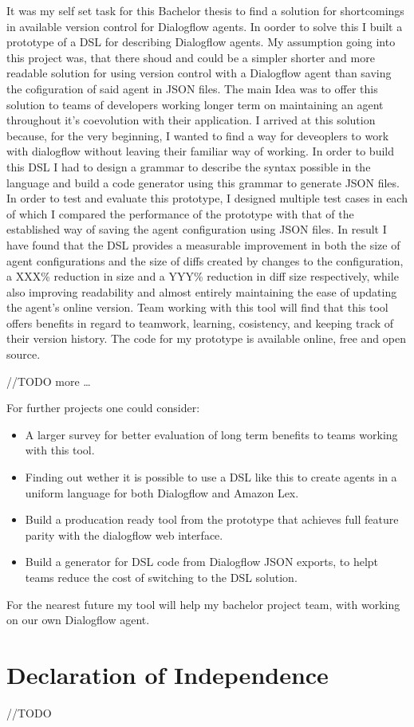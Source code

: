 It was my self set task for this Bachelor thesis to find a solution for shortcomings in available version control for Dialogflow agents. In oorder to solve this I built a prototype of a DSL for describing Dialogflow agents.
My assumption going into this project was, that there shoud and could be a simpler shorter and more readable solution for using version control with a Dialogflow agent than saving the cofiguration of said agent in JSON files.
The main Idea was to offer this solution to teams of developers working longer term on maintaining an agent throughout it's coevolution with their application.
I arrived at this solution because, for the very beginning, I wanted to find a way for deveoplers to work with dialogflow without leaving their familiar way of working.
In order to build this DSL I had to design a grammar to describe the syntax possible in the language and build a code generator using this grammar to generate JSON files.
In order to test and evaluate this prototype, I designed multiple test cases in each of which I compared the performance of the prototype with that of the established way of saving the agent configuration using JSON files.
In result I have found that the DSL provides a measurable improvement in both the size of agent configurations and the size of diffs created by changes to the configuration, a XXX\% reduction in size and a YYY\% reduction in diff size respectively, while also improving readability and almost entirely maintaining the ease of updating the agent's online version.
Team working with this tool will find that this tool offers benefits in regard to teamwork, learning, cosistency, and keeping track of their version history.
The code for my prototype is available online, free and open source.

//TODO more
\dots


For further projects one could consider:
\begin{itemize}
    \item A larger survey for better evaluation of long term benefits to teams working with this tool.
    \item Finding out wether it is possible to use a DSL like this to create agents in a uniform language for both Dialogflow and Amazon Lex.
    \item Build a producation ready tool from the prototype that achieves full feature parity with the dialogflow web interface.
    \item Build a generator for DSL code from Dialogflow JSON exports, to helpt teams reduce the cost of switching to the DSL solution.
\end{itemize}

For the nearest future my tool will help my bachelor project team, with working on our own Dialogflow agent.


\chapter{Declaration of Independence}
//TODO
